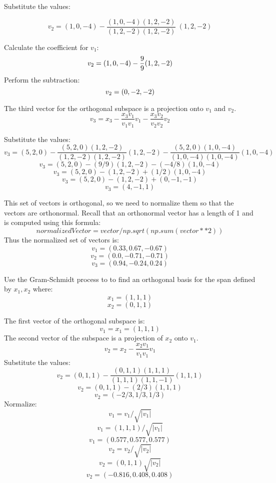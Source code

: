 Substitute the values:

$$v_2 = (1, 0, -4)  - \frac{(1,0, -4)(1,2,-2)}{(1,2,-2)(1,2,-2)} \ (1, 2, -2) $$

Calculate the coefficient for $v_1$:
$$v_2 = (1, 0, -4) - \frac{9}{9} (1, 2, -2)  \\$$
Perform the subtraction:
$$v_2 = (0, -2, -2) \\$$
 
The third vector for the orthogonal subspace is a projection onto $v_1$ and $v_2$. 
$$v_3 = x_3 - \frac{x_3v_1}{v_1v_1} v_1 - \frac{x_3v_2}{v_2v_2} v_2$$

Substitute the values:
$$v_3 = (5,2,0) - \frac{(5,2,0)(1,2,-2)}{(1,2,-2)(1,2,-2)} (1,2,-2) - \frac{(5,2,0)(1,0,-4)}{(1,0,-4)(1,0,-4)} (1,0,-4)$$
$$v_3 =  (5,2,0)  - (9/9) (1,2,-2) -  (-4/8)(1,0,-4)$$
$$v_3 =  (5,2,0) - (1,2,-2) + (1/2)(1,0,-4)$$
$$v_3  = (5,2,0 ) - (1,2,-2) + (0,-1,-1)$$
$$v_3 = (4, -1, 1)$$

This set of vectors is orthogonal, so we need to normalize them so that the vectors are orthonormal. Recall that an orthonormal vector has a length of 1 and is computed using this formula:
$$normalizedVector = vector / np.sqrt(np.sum(vector**2))$$
Thus the normalized set of vectors is:
$$v_1 = (0.33,  0.67, -0.67)$$
$$v_2 = (0.0,  -0.71, -0.71 )$$
$$v_3 = (0.94, -0.24,  0.24 ) $$

\begin{Exercise}[title={Gram-Schmidt Process}, label=gram_schmidt]
    Use the Gram-Schmidt process to to find an orthogonal basis for the span defined by $x_1, x_2$ where:
    $$x_1 = (1, 1, 1)$$
	$$x_2 = (0, 1, 1) $$
\end{Exercise}
\begin{Answer}[ref=gram_schmidt]
      The first vector of the orthogonal subspace is: 
		$$v_1 = x_1 =  (1, 1, 1) $$ 
	  The second vector of the subspace is a projection of $x_2$ onto $v_1$.
	  $$v_2 = x_2 - \frac{x_2v_1}{v_1v_1} v_1$$
	  Substitute the values:
	  $$v_2 =  (0, 1, 1)  - \frac{(0,1, 1)(1,1,1)}{(1,1,1)(1,1,-1)}  (1, 1, 1)$$
	  $$v_2 =  (0, 1, 1)  - (2/3) (1, 1, 1) $$
	  $$v_2 =  (-2/3, 1/3, 1/3)$$
	  Normalize:
	  $$v_1 = v_1/\sqrt{|v_1|} $$
	  $$v_1 = (1, 1, 1 )/\sqrt{|v_1|} $$
	  $$v_1 = (0.577, 0.577, 0.577)  $$  
	  $$v_2 = v_2/\sqrt{|v_2|} $$
	  $$v_2 = (0, 1, 1) \sqrt{|v_2|} $$
	  $$v_2 =  (-0.816,  0.408,  0.408) $$
\end{Answer}

